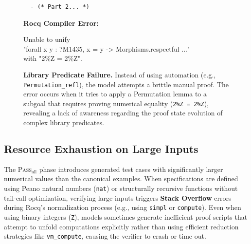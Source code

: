 \begin{figure}[t!]
\begin{tcolorbox}
\begin{tcolorbox}[
        colback=white,
        colframe=white,
        frame hidden,
        boxrule=0pt,
        sharp corners,
        top=3pt, bottom=3pt, left=3pt, right=3pt
    ]
\begin{lstlisting}
  - (* Part 2... *)
    \end{lstlisting}
    \end{tcolorbox}

    \vspace{0.2cm}
    
    \textbf{Rocq Compiler Error:}
    \vspace{2pt}
    \begin{tcolorbox}[
        colback=red!5!white,
        colframe=red!75!black,
        left=2pt, right=2pt, top=2pt, bottom=2pt,
        arc=0mm, boxrule=0.5pt,
        title=Compiler Output,
        fonttitle=\bfseries\scriptsize,
        coltitle=white
    ]
    \footnotesize\ttfamily\color{red!40!black}
    Unable to unify\\
    "forall x y : ?M1435, x = y -> Morphisms.respectful ..."\\
    with "2\%Z = 2\%Z".
    \end{tcolorbox}
    \end{tcolorbox}
    
    \caption{\textbf{Library Predicate Failure.} Instead of using automation (e.g., \texttt{Permutation\_refl}), the model attempts a brittle manual proof. The error occurs when it tries to apply a Permutation lemma to a subgoal that requires proving numerical equality (\texttt{2\%Z = 2\%Z}), revealing a lack of awareness regarding the proof state evolution of complex library predicates.}
    \label{fig:library_barrier_failure}
\end{figure}

\subsection{Resource Exhaustion on Large Inputs}
The \textsc{Pass}$_{\text{all}}$ phase introduces generated test cases with significantly larger numerical values than the canonical examples. 
When specifications are defined using Peano natural numbers (\texttt{nat}) or structurally recursive functions without tail-call optimization, verifying large inputs triggers \textbf{Stack Overflow} errors during Rocq's normalization process (e.g., using \texttt{simpl} or \texttt{compute}). Even when using binary integers (\texttt{Z}), models sometimes generate inefficient proof scripts that attempt to unfold computations explicitly rather than using efficient reduction strategies like \texttt{vm\_compute}, causing the verifier to crash or time out.
